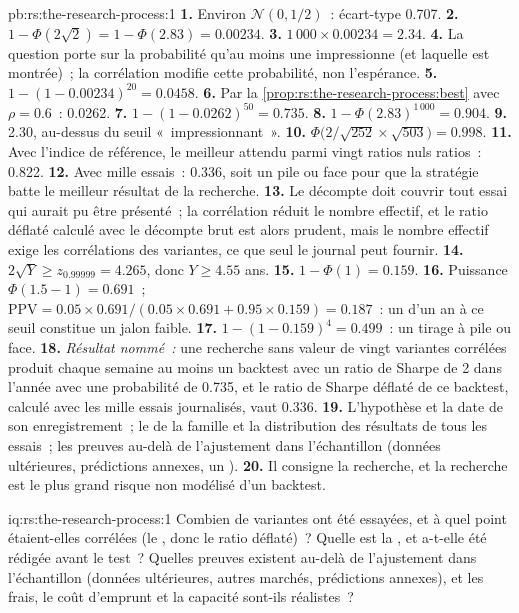 \begin{solution}{pb:rs:the-research-process:1}
\textbf{1.} Environ $\mathcal N(0, 1/2)$~: écart-type 0.707. \textbf{2.} $1 - \Phi(2\sqrt2) = 1 - \Phi(2.83) = 0.00234$.
\textbf{3.} $1\,000 \times 0.00234 = 2.34$. \textbf{4.} La question porte sur la probabilité qu'au moins une impressionne (et laquelle est
montrée)~; la corrélation modifie cette probabilité, non l'espérance. \textbf{5.} $1 - (1 - 0.00234)^{20} = 0.0458$.
\textbf{6.} Par la \cref{prop:rs:the-research-process:best} avec $\rho = 0.6$~: 0.0262. \textbf{7.} $1 - (1 - 0.0262)^{50} = 0.735$.
\textbf{8.} $1 - \Phi(2.83)^{1\,000} = 0.904$. \textbf{9.} 2.30, au-dessus du seuil «~impressionnant~».
\textbf{10.} $\Phi\bigl(2/\sqrt{252} \times \sqrt{503}\bigr) = 0.998$. \textbf{11.} Avec l'indice de référence, le meilleur attendu parmi vingt ratios nuls
ratios~: 0.822. \textbf{12.} Avec mille essais~: 0.336, soit un pile ou face pour que la stratégie batte le meilleur résultat de la recherche.
\textbf{13.} Le décompte doit couvrir tout essai qui aurait pu être présenté~; la corrélation réduit le nombre effectif, et le
ratio déflaté calculé avec le décompte brut est alors prudent, mais le nombre effectif exige les corrélations des variantes, ce que seul
le journal peut fournir. \textbf{14.} $2\sqrt Y \ge z_{0.99999} = 4.265$, donc $Y \ge 4.55$ ans.
\textbf{15.} $1 - \Phi(1) = 0.159$. \textbf{16.} Puissance $\Phi(1.5 - 1) = 0.691$~; $\mathrm{PPV} = 0.05 \times 0.691/(0.05 \times 0.691 + 0.95
\times 0.159) = 0.187$~: un  d'un an à ce seuil constitue un jalon faible. \textbf{17.} $1 - (1 - 0.159)^4 = 0.499$~: un tirage à
pile ou face. \textbf{18.} \emph{Résultat nommé~:} une recherche sans valeur de vingt variantes corrélées produit chaque semaine au moins un backtest
avec un ratio de Sharpe de 2 dans l'année avec une probabilité de 0.735, et le ratio de Sharpe déflaté de ce backtest, calculé avec les
mille essais journalisés, vaut 0.336. \textbf{19.} L'hypothèse et la date de son enregistrement~; le  de la famille et la
distribution des résultats de tous les essais~; les preuves au-delà de l'ajustement dans l'échantillon (données ultérieures, prédictions annexes, un ).
\textbf{20.} Il consigne la recherche, et la recherche est le plus grand risque non modélisé d'un backtest.
\end{solution}

\begin{solution}{iq:rs:the-research-process:1}
Combien de variantes ont été essayées, et à quel point étaient-elles corrélées (le , donc le ratio déflaté)~? Quelle est la
, et a-t-elle été rédigée avant le test~? Quelles preuves existent au-delà de l'ajustement dans l'échantillon (données ultérieures, autres marchés, prédictions
annexes), et les frais, le coût d'emprunt et la capacité sont-ils réalistes~?
\end{solution}

